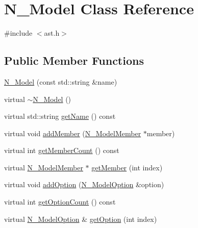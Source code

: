 \hypertarget{classN__Model}{}\section{N\+\_\+\+Model Class Reference}
\label{classN__Model}


{\ttfamily \#include $<$ast.\+h$>$}

\subsection*{Public Member Functions}
\begin{DoxyCompactItemize}
\item 
\hyperlink{classN__Model_a1daec6e71b170ad19acd92a0610d3c3b}{N\+\_\+\+Model} (const std\+::string \&name)
\item 
virtual \hyperlink{classN__Model_adf9eb562be34647c3ea86c0e0977d64e}{$\sim$\+N\+\_\+\+Model} ()
\item 
virtual std\+::string \hyperlink{classN__Model_a1271bdcab31a78aef8a1de598cd3158c}{get\+Name} () const 
\item 
virtual void \hyperlink{classN__Model_ac10c3efe2443db62bbf44d3430c1298f}{add\+Member} (\hyperlink{classN__ModelMember}{N\+\_\+\+Model\+Member} $\ast$member)
\item 
virtual int \hyperlink{classN__Model_a67f00ff3575e7c7f2754dce0dc42870f}{get\+Member\+Count} () const 
\item 
virtual \hyperlink{classN__ModelMember}{N\+\_\+\+Model\+Member} $\ast$ \hyperlink{classN__Model_a0b27d0fa5410fe08b6d6564048a057db}{get\+Member} (int index)
\item 
virtual void \hyperlink{classN__Model_a6a25ea55dc864af8dc0e23829661f5c2}{add\+Option} (\hyperlink{classN__ModelOption}{N\+\_\+\+Model\+Option} \&option)
\item 
virtual int \hyperlink{classN__Model_a917f55a3f1886f77164761b3553030e5}{get\+Option\+Count} () const 
\item 
virtual \hyperlink{classN__ModelOption}{N\+\_\+\+Model\+Option} \& \hyperlink{classN__Model_a5582c8fbdbb9b7860da7c26c6be299f9}{get\+Option} (int index)
\end{DoxyCompactItemize}
